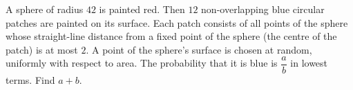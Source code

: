 A sphere of radius $42$ is painted red. Then $12$ non-overlapping blue circular patches are painted on its surface. Each patch consists of all points of the sphere whose straight-line distance from a fixed point of the sphere (the centre of the patch) is at most $2$. A point of the sphere's surface is chosen at random, uniformly with respect to area. The probability that it is blue is $\dfrac ab$ in lowest terms. Find $a+b$.
